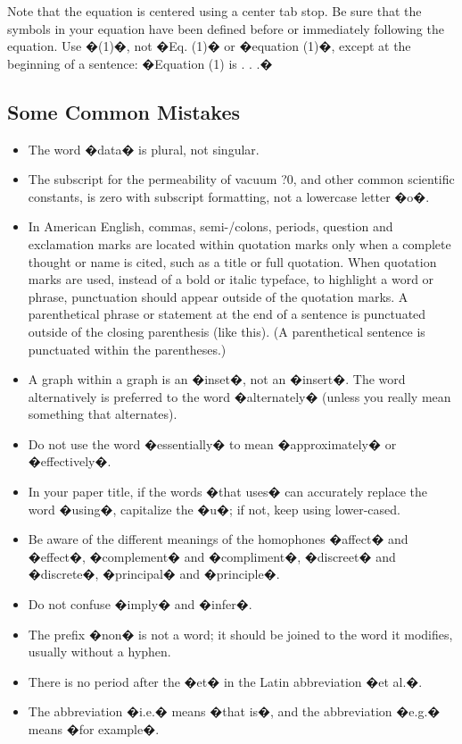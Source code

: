 \documentclass[letterpaper, 10 pt, conference]{ieeeconf}  %
\begin{document}
Note that the equation is centered using a center tab stop. Be sure that the symbols in your equation have been defined before or immediately following the equation. Use �(1)�, not �Eq. (1)� or �equation (1)�, except at the beginning of a sentence: �Equation (1) is . . .�

\subsection{Some Common Mistakes}
\begin{itemize}


\item The word �data� is plural, not singular.
\item The subscript for the permeability of vacuum ?0, and other common scientific constants, is zero with subscript formatting, not a lowercase letter �o�.
\item In American English, commas, semi-/colons, periods, question and exclamation marks are located within quotation marks only when a complete thought or name is cited, such as a title or full quotation. When quotation marks are used, instead of a bold or italic typeface, to highlight a word or phrase, punctuation should appear outside of the quotation marks. A parenthetical phrase or statement at the end of a sentence is punctuated outside of the closing parenthesis (like this). (A parenthetical sentence is punctuated within the parentheses.)
\item A graph within a graph is an �inset�, not an �insert�. The word alternatively is preferred to the word �alternately� (unless you really mean something that alternates).
\item Do not use the word �essentially� to mean �approximately� or �effectively�.
\item In your paper title, if the words �that uses� can accurately replace the word �using�, capitalize the �u�; if not, keep using lower-cased.
\item Be aware of the different meanings of the homophones �affect� and �effect�, �complement� and �compliment�, �discreet� and �discrete�, �principal� and �principle�.
\item Do not confuse �imply� and �infer�.
\item The prefix �non� is not a word; it should be joined to the word it modifies, usually without a hyphen.
\item There is no period after the �et� in the Latin abbreviation �et al.�.
\item The abbreviation �i.e.� means �that is�, and the abbreviation �e.g.� means �for example�.

\end{itemize}
\end{document}
